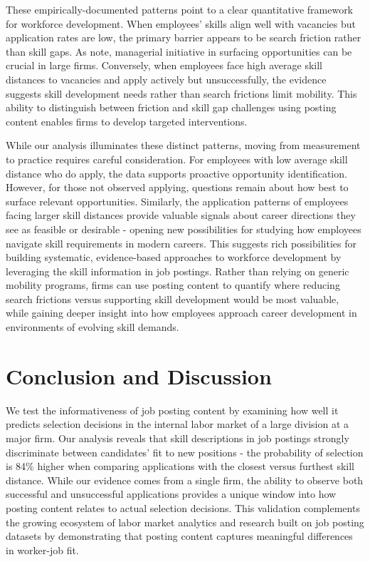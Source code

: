 \documentclass[12pt]{article}
\begin{document}
These empirically-documented patterns point to a clear quantitative framework for workforce development. When employees' skills align well with vacancies but application rates are low, the primary barrier appears to be search friction rather than skill gaps. As \autocite{invisiblehand} note, managerial initiative in surfacing opportunities can be crucial in large firms. Conversely, when employees face high average skill distances to vacancies and apply actively but unsuccessfully, the evidence suggests skill development needs rather than search frictions limit mobility. This ability to distinguish between friction and skill gap challenges using posting content enables firms to develop targeted interventions.

While our analysis illuminates these distinct patterns, moving from measurement to practice requires careful consideration. For employees with low average skill distance who do apply, the data supports proactive opportunity identification. However, for those not observed applying, questions remain about how best to surface relevant opportunities. Similarly, the application patterns of employees facing larger skill distances provide valuable signals about career directions they see as feasible or desirable - opening new possibilities for studying how employees navigate skill requirements in modern careers. This suggests rich possibilities for building systematic, evidence-based approaches to workforce development by leveraging the skill information in job postings. Rather than relying on generic mobility programs, firms can use posting content to quantify where reducing search frictions versus supporting skill development would be most valuable, while gaining deeper insight into how employees approach career development in environments of evolving skill demands.


\section{Conclusion and Discussion}\label{sec:conclusion_discussion}


We test the informativeness of job posting content by examining how well it predicts selection decisions in the internal labor market of a large division at a major firm. Our analysis reveals that skill descriptions in job postings strongly discriminate between candidates' fit to new positions - the probability of selection is 84\% higher when comparing applications with the closest versus furthest skill distance. While our evidence comes from a single firm, the ability to observe both successful and unsuccessful applications provides a unique window into how posting content relates to actual selection decisions. This validation complements the growing ecosystem of labor market analytics and research built on job posting datasets by demonstrating that posting content captures meaningful differences in worker-job fit.
\end{document}
